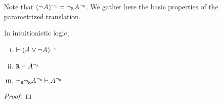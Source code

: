 Note that $(\neg A)^{\neg_{\texttt{R}}} = {\neg_{\texttt{R}}} A^{\neg_{\texttt{R}}}$. We gather here the basic properties of the parametrized translation.

\begin{proposition}
    In intuitionistic logic,
    \begin{enumerate}[(i)]
        \item $\vdash (A\vee \neg A)^{\neg_{\texttt{R}}}$
        \item $\texttt{R} \vdash A^{\neg_{\texttt{R}}}$
        \item ${\neg_{\texttt{R}}}{\neg_{\texttt{R}}} A^{\neg_{\texttt{R}}} \vdash A^{\neg_{\texttt{R}}}$
    \end{enumerate}
\end{proposition}
\begin{proof}
    
\end{proof}


